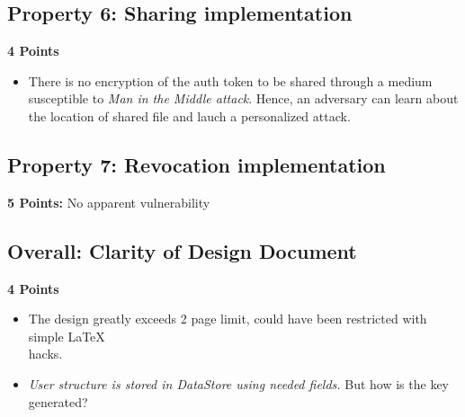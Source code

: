 \documentclass[12pt]{article}
\begin{document}
\subsection*{Property 6: Sharing implementation}
\textbf{4 Points}
\vspace{-0.2cm}

\begin{itemize}[wide=0pt, noitemsep]
	\itemsep0em
	\item There is no encryption of the auth token to be shared through a medium susceptible to \textit{Man in the Middle attack}. Hence, an adversary can learn about the location of shared file and lauch a personalized attack.
\end{itemize}

\subsection*{Property 7: Revocation implementation}
\textbf{5 Points:}  No apparent vulnerability
\vspace{-0.2cm}
	

\subsection*{Overall: Clarity of Design Document}
\textbf{4 Points}
\vspace{-0.2cm}

\begin{itemize}[wide=0pt, noitemsep]
	\itemsep0em
	\item The design greatly exceeds 2 page limit, could have been restricted with simple \LaTeX \\ hacks.
	\item \textit{User structure is stored in DataStore using needed fields.} But how is the key generated?
\end{itemize}
\end{document}
